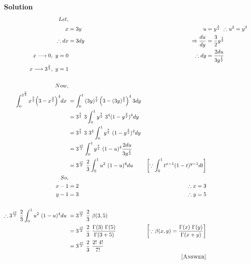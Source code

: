 \documentclass[12pt]{article}
\begin{document}
\textbf{Solution}
\begin{align*}
    Let,\\ x&=3y & u&=y^{\frac{3}{2}}\ \therefore u^2=y^3\\
    \therefore dx&=3dy & \Rightarrow\frac{du}{dy}&=\frac{3}{2}y^{\frac{1}{2}}\\
    x \longrightarrow 0, \ y=0 & & \therefore dy&=\frac{2du}{3y^{\frac{1}{2}}}\\
    x \longrightarrow 3^{\frac{2}{3}}, \ y=1\\\\
    Now,\\ \int_{0}^{3^{\frac{2}{3}}}{x^{\frac{7}{2}}}{\left(3-x^{\frac{3}{2}}\right)^4}dx\ &= \int_{0}^{1}{(3y)^{\frac{7}{2}}}\left({3-(3y)^{\frac{3}{2}}}\right)^43dy\\
    &=3^\frac{7}{2}\ 3 \int_{0}^{1}{y^{\frac{7}{2}}}\ {3^4(1-y^{\frac{3}{2}})^4}dy\\
    &=3^\frac{7}{2}\ 3\ 3^4 \int_{0}^{1}{y^{\frac{7}{2}}}\ {(1-y^{\frac{3}{2}})^4}dy\\
    &=3^\frac{17}{2} \int_{0}^{1}{y^{\frac{7}{2}}}\ {(1-u)^4}\frac{2du}{3y^{\frac{1}{2}}}\\
    &=3^\frac{17}{2}\ \frac{2}{3} \int_{0}^{1}{u^2}\ {(1-u)^4}du & \left[\because \int_{0}^{1} t^{x-1}(1-t)^{y-1}dt\right] \\
    So,\\ x-1&=2 & \therefore x=3\\
    y-1&=3 & \therefore y=5\\\\
    \therefore 3^\frac{17}{2}\ \frac{2}{3} \int_{0}^{1}{u^2}\ {(1-u)^4}du\ &=3^\frac{17}{2}\ \frac{2}{3}\ \beta(3,5)\\
    &=3^\frac{17}{2}\ \frac{2}{3}\ \frac{\Gamma(3)\ \Gamma(5)}{\Gamma(3+5)} &  \left[\because \beta(x,y)= \frac{\Gamma(x)\ \Gamma(y)}{\Gamma(x+y)}\right]\\
    &=3^\frac{17}{2}\ \frac{2}{3}\ \frac{2!\ 4!}{7!}\\
    & & \textsc{[Answer]}
\end{align*}
\end{document}
